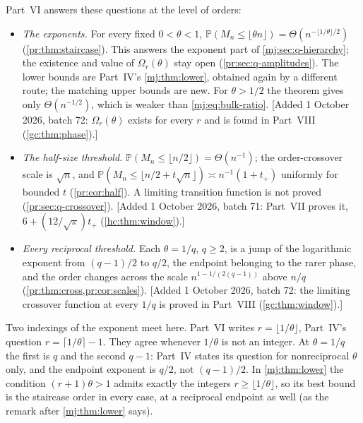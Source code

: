 \documentclass[11pt,a4paper]{article}
\theoremstyle{definition}\newaliascnt{definition}{theorem}
\theoremstyle{remark}\newaliascnt{remark}{theorem}
\newcommand{\ljP}{\mathbb P}
\begin{document}
Part~VI answers these questions at the level of orders:
\begin{itemize}
\item \emph{The exponents.} For every fixed $0<\theta<1$,
 $\ljP(M_n\le\lfloor\theta n\rfloor)=\Theta(n^{-\lfloor1/\theta\rfloor/2})$
 (\cref{pr:thm:staircase}). This answers the exponent part of
 \cref{mj:sec:q-hierarchy}; the existence and value of $\Omega_r(\theta)$
 stay open (\cref{pr:sec:q-amplitudes}). The lower bounds are Part~IV's
 \cref{mj:thm:lower}, obtained again by a different route; the matching
 upper bounds are new. For $\theta>1/2$ the theorem gives only
 $\Theta(n^{-1/2})$, which is weaker than \eqref{mj:eq:bulk-ratio}. [Added
 1 October 2026, batch 72: $\Omega_r(\theta)$ exists for every $r$ and is
 found in Part~VIII (\cref{gc:thm:phase}).]
\item \emph{The half-size threshold.} $\ljP(M_n\le\lfloor n/2\rfloor)=\Theta(n^{-1})$;
 the order-crossover scale is $\sqrt n$, and
 $\ljP(M_n\le\lfloor n/2+t\sqrt n\rfloor)\asymp n^{-1}(1+t_+)$ uniformly for
 bounded $t$ (\cref{pr:cor:half}). A limiting transition function is not
 proved (\cref{pr:sec:q-crossover}). [Added 1 October 2026, batch 71:
 Part~VII proves it, $6+(12/\sqrt\pi)t_+$ (\cref{hc:thm:window}).]
\item \emph{Every reciprocal threshold.} Each $\theta=1/q$, $q\ge2$, is a
 jump of the logarithmic exponent from $(q-1)/2$ to $q/2$, the endpoint
 belonging to the rarer phase, and the order changes across the scale
 $n^{1-1/(2(q-1))}$ above $n/q$ (\cref{pr:thm:cross,pr:cor:scales}). [Added
 1 October 2026, batch 72: the limiting crossover function at every $1/q$ is
 proved in Part~VIII (\cref{gc:thm:window}).]
\end{itemize}

Two indexings of the exponent meet here. Part~VI writes
$r=\lfloor1/\theta\rfloor$, Part~IV's question $r=\lceil1/\theta\rceil-1$.
They agree whenever $1/\theta$ is not an integer. At $\theta=1/q$ the first
is $q$ and the second $q-1$: Part~IV states its question for nonreciprocal
$\theta$ only, and the endpoint exponent is $q/2$, not $(q-1)/2$. In
\cref{mj:thm:lower} the condition $(r+1)\theta>1$ admits exactly the
integers $r\ge\lfloor1/\theta\rfloor$, so its best bound is the staircase
order in every case, at a reciprocal endpoint as well (as the remark after
\cref{mj:thm:lower} says).
\end{document}
